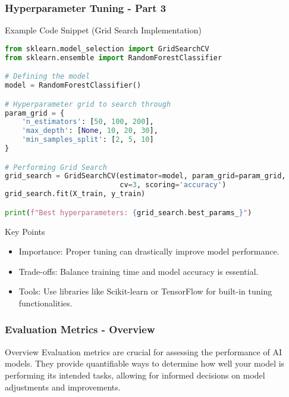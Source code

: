 \documentclass[aspectratio=169]{beamer}
\begin{document}
\begin{frame}[fragile]
    \frametitle{Hyperparameter Tuning - Part 3}

    \begin{block}{Example Code Snippet (Grid Search Implementation)}
        \begin{lstlisting}[language=Python]
from sklearn.model_selection import GridSearchCV
from sklearn.ensemble import RandomForestClassifier

# Defining the model
model = RandomForestClassifier()

# Hyperparameter grid to search through
param_grid = {
    'n_estimators': [50, 100, 200],
    'max_depth': [None, 10, 20, 30],
    'min_samples_split': [2, 5, 10]
}

# Performing Grid Search
grid_search = GridSearchCV(estimator=model, param_grid=param_grid, 
                           cv=3, scoring='accuracy')
grid_search.fit(X_train, y_train)

print(f"Best hyperparameters: {grid_search.best_params_}")
        \end{lstlisting}
    \end{block}

    \begin{block}{Key Points}
        \begin{itemize}
            \item Importance: Proper tuning can drastically improve model performance.
            \item Trade-offs: Balance training time and model accuracy is essential.
            \item Tools: Use libraries like Scikit-learn or TensorFlow for built-in tuning functionalities.
        \end{itemize}
    \end{block}

\end{frame}

\begin{frame}[fragile]
    \frametitle{Evaluation Metrics - Overview}
    \begin{block}{Overview}
        Evaluation metrics are crucial for assessing the performance of AI models. They provide quantifiable ways to determine how well your model is performing its intended tasks, allowing for informed decisions on model adjustments and improvements.
    \end{block}
\end{frame}
\end{document}
